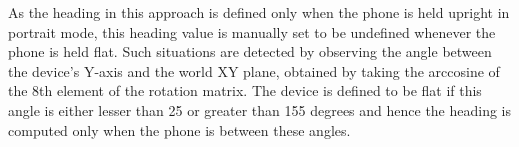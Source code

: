 \documentclass[main.tex]{subfiles}
\begin{document}
As the heading in this approach is defined only when the phone is held upright in portrait mode, this heading value is manually set to be undefined whenever the phone is held flat. Such situations are detected by observing the angle between the device's Y-axis and the world XY plane, obtained by taking the arccosine of the 8th element of the rotation matrix. The device is defined to be flat if this angle is either lesser than 25 or greater than 155 degrees and hence the heading is computed only when the phone is between these angles.
\end{document}
